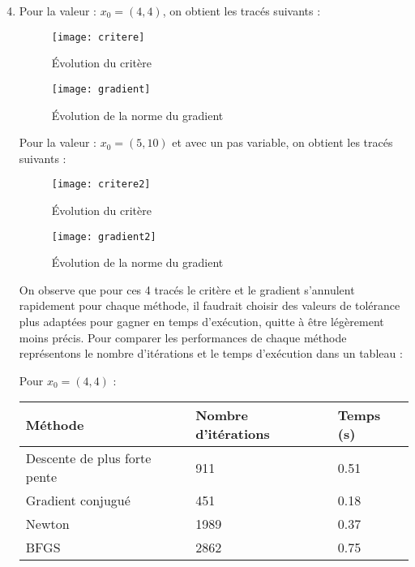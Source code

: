\documentclass[12pt,a4paper,titlepage]{article}
\begin{document}
\begin{enumerate}
        \setcounter{enumi}{3}
    \item{
            Pour la valeur : $x_0 = (4, 4)$, on obtient les tracés suivants :

            \begin{figure}[H]
                \centering
                \texttt{[image: critere]}
                \caption{Évolution du critère}
            \end{figure}

            \begin{figure}[H]
                \centering
                \texttt{[image: gradient]}
                \caption{Évolution de la norme du gradient}
            \end{figure}

            Pour la valeur : $x_0 = (5, 10)$ et avec un pas variable, on obtient les tracés suivants :

            \begin{figure}[H]
                \centering
                \texttt{[image: critere2]}
                \caption{Évolution du critère}
            \end{figure}

            \begin{figure}[H]
                \centering
                \texttt{[image: gradient2]}
                \caption{Évolution de la norme du gradient}
            \end{figure}

            On observe que pour ces 4 tracés le critère et le gradient s'annulent
            rapidement pour chaque méthode, il faudrait choisir des valeurs de tolérance plus
            adaptées pour gagner en temps d'exécution, quitte à être légèrement moins précis.
            Pour comparer les performances de chaque méthode représentons le nombre d'itérations
            et le temps d'exécution dans un tableau :

            Pour $x_0 = (4,4)$ :

            \begin{table}[H]
                \begin{tabularx}{\textwidth}{ |l|X|X| }
                    \hline
                    Méthode & Nombre d'itérations & Temps (s) \\
                    \hline
                    Descente de plus forte pente & 911 & 0.51 \\
                    \hline
                    Gradient conjugué & 451  & 0.18 \\
                    \hline
                    Newton & 1989 & 0.37 \\
                    \hline
                    BFGS & 2862 & 0.75 \\
                    \hline
                \end{tabularx}
            \end{table}

}
\end{enumerate}
\end{document}
